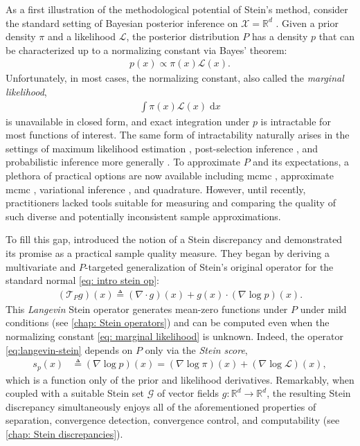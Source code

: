 \documentclass[12pt,paper=letter]{scrreprt}
\def\defeq{\triangleq} %
\begin{document}
As a first illustration of the methodological potential of Stein's method, consider the standard setting of Bayesian posterior inference on $\mathcal{X} = \mathbb{R}^d$  \citep{GelmanCaStDuVeRu2014}.  
Given a prior density $\pi$ and a likelihood $\mathcal{L}$, the posterior distribution $P$ has a density $p$ that can be characterized up to a normalizing constant via Bayes' theorem:
\begin{align}
    p(x) \propto \pi(x) \mathcal{L}(x).
\end{align}
Unfortunately, in most cases, the normalizing constant, also called the \emph{marginal likelihood}, 
\begin{align}
    \int \pi(x) \mathcal{L}(x) \; \mathrm{d}x \label{eq: marginal likelihood}
\end{align}
is unavailable in closed form, and exact integration under $p$ is intractable for most functions of interest.  The same form of intractability naturally arises in the settings of maximum likelihood estimation \citep{geyer1991markov}, post-selection inference \citep{tian2016magic}, and probabilistic inference more generally \citep{neal1993probabilistic}. 
To approximate $P$ and its expectations, a plethora of practical options are now available including \ac{mcmc} \citep{brooks2011handbook}, approximate \ac{mcmc} \citep[see, e.g.,][]{welling2011bayesian}, variational inference \citep{blei2017variational}, and  quadrature. However, until recently, practitioners lacked tools suitable for measuring and comparing the quality of such diverse and potentially inconsistent sample approximations. 

To fill this gap, \citet{gorham2015measuring} introduced the notion of a Stein discrepancy and demonstrated its promise as a practical sample quality measure.
They began by deriving a multivariate and $P$-targeted generalization of Stein's original operator for the standard normal \cref{eq: intro stein op}: 
\begin{align}\label{eq:langevin-stein}
    (\mathcal{T}_P g)(x) \defeq (\nabla \cdot g)(x) + g(x) \cdot (\nabla \log p)(x).
\end{align}
This \emph{Langevin} Stein operator generates mean-zero functions under $P$ under mild conditions (see \cref{chap: Stein operators}) and 
can be computed even when the normalizing constant \eqref{eq: marginal likelihood} is unknown. 
Indeed, the operator \cref{eq:langevin-stein} depends on $P$ only via the 
\emph{Stein score}, 
\begin{align*}
    s_p(x) & \defeq (\nabla \log p)(x)
    = (\nabla \log \pi)(x) + (\nabla \log \mathcal{L})(x),
\end{align*}
which is a function only of the prior and likelihood derivatives. 
Remarkably, when coupled with a suitable Stein set $\mathcal{G}$ of vector fields $g : \mathbb{R}^d \rightarrow \mathbb{R}^d$, the resulting Stein discrepancy simultaneously enjoys all of the aforementioned properties of separation, convergence detection, convergence control, and computability (see \cref{chap: Stein discrepancies}).
\end{document}
